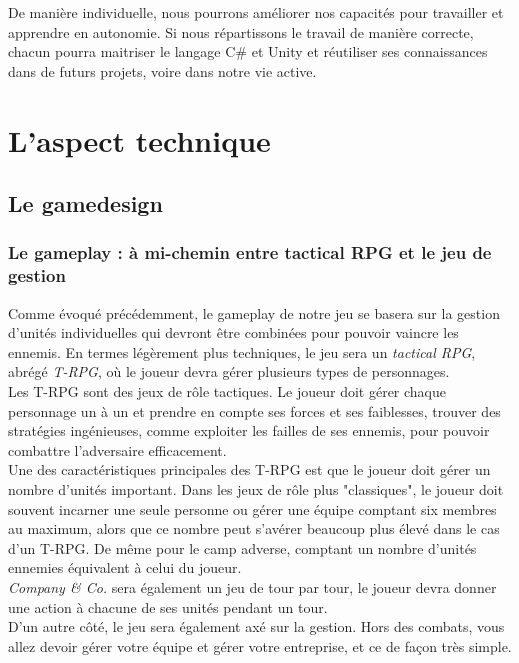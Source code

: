 \documentclass{article}
\begin{document}
De manière individuelle, nous pourrons améliorer nos capacités pour travailler et apprendre en autonomie. Si nous répartissons le travail de manière correcte, chacun pourra maitriser le langage C\# et Unity et réutiliser ses connaissances dans de futurs projets, voire dans notre vie active.

\section{L'aspect technique}
\subsection{Le gamedesign}

\subsubsection{Le gameplay : à mi-chemin entre tactical RPG et le jeu de gestion}

Comme évoqué précédemment, le gameplay de notre jeu se basera sur la gestion d'unités individuelles qui devront être combinées pour pouvoir vaincre les ennemis. En termes légèrement plus techniques, le jeu sera un \textit{tactical RPG}, abrégé \textit{T-RPG}, où le joueur devra gérer plusieurs types de personnages.\\

Les T-RPG sont des jeux de rôle tactiques. Le joueur doit gérer chaque personnage un à un et prendre en compte ses forces et ses faiblesses, trouver des stratégies ingénieuses, comme exploiter les failles de ses ennemis, pour pouvoir combattre l'adversaire efficacement.\\

Une des caractéristiques principales des T-RPG est que le joueur doit gérer un nombre d'unités important. Dans les jeux de rôle plus "classiques", le joueur doit souvent incarner une seule personne ou gérer une équipe comptant six membres au maximum, alors que ce nombre peut s'avérer beaucoup plus élevé dans le cas d'un T-RPG. De même pour le camp adverse, comptant un nombre d'unités ennemies équivalent à celui du joueur.\\

\textit{Company \& Co.} sera également un jeu de tour par tour, le joueur devra donner une action à chacune de ses unités pendant un tour.\\

D'un autre côté, le jeu sera également axé sur la gestion. Hors des combats, vous allez devoir gérer votre équipe et gérer votre entreprise, et ce de façon très simple.\\
\end{document}
